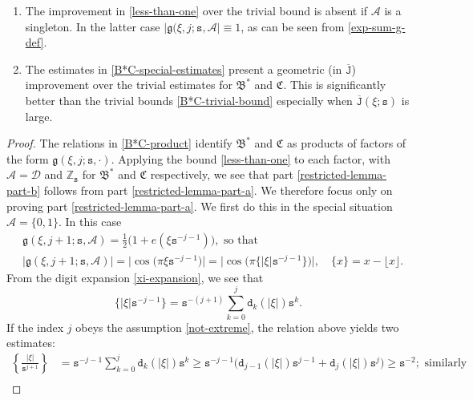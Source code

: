 \documentclass[12pt, twoside]{article}
\theoremstyle{definition}
\numberwithin{equation}{section}
\begin{document}
\vskip0.1in 
 \begin{enumerate}[1.]
\item The improvement in \eqref{less-than-one} over the trivial bound is absent if $\mathscr{A}$ is a singleton. In the latter case $|\mathfrak g(\xi, j; \mathtt s, \mathscr{A}| \equiv 1$, as can be seen from \eqref{exp-sum-g-def}. 
\item The estimates in \eqref{B*C-special-estimates} present a geometric (in $\overline{\mathtt J}$) improvement over the trivial estimates for $\mathfrak B^{\ast}$ and $\mathfrak C$. This is significantly better than the trivial bounds \eqref{B*C-trivial-bound} especially when $\overline{\mathtt J}(\xi; \mathtt s)$ is large.    
\end{enumerate} 
\begin{proof} 
The relations in \eqref{B*C-product} identify $\mathfrak B^{\ast}$ and $\mathfrak C$ as products of factors of the form $\mathfrak g(\xi, j; \mathtt s, \cdot)$. Applying the bound \eqref{less-than-one} to each factor, with $\mathscr{A} = \mathscr{D}$ and $\mathbb Z_{\mathtt s}$ for $\mathfrak{B}^{\ast}$ and $\mathfrak C$ respectively, we see that part \eqref{restricted-lemma-part-b} follows from part \eqref{restricted-lemma-part-a}. We therefore focus only on proving part \eqref{restricted-lemma-part-a}. We first do this in the special situation $\mathscr{A} = \{0, 1\}$. In this case 
\begin{align} 
&\mathfrak g(\xi, j+1; \mathtt s, \mathscr{A}) = \frac{1}{2} \bigl( 1 + e(\xi \mathtt s^{-j-1})\bigr), \text{ so that } \nonumber  \\ 
&\bigl|\mathfrak g(\xi, j+1; \mathtt s, \mathscr{A}) \bigr| = \bigl| \cos \bigl({\pi \xi}{\mathtt s^{-j-1}}\bigr) \bigr| =   \bigl|\cos \bigl(\pi\bigl\{{ |\xi|}{\mathtt s^{-j-1}} \bigr\}\bigr) \bigr|,  \quad \{x\} = x - \lfloor x \rfloor.  \label{D01} 
\end{align} 
From the digit expansion \eqref{xi-expansion}, we see that 
\[ \{|\xi| \mathtt s^{-j-1}\} = \mathtt s^{-(j+1)} \sum_{k=0}^j \mathtt  d_k(|\xi|) \mathtt s^k.  \]   
If the index $j$ obeys the assumption \eqref{not-extreme}, the relation above yields two estimates:
 \begin{align}  
 \left\{\frac{|\xi|}{\mathtt s^{j+1}}\right\}  &=  \mathtt s^{-j-1} \sum_{k=0}^{j} \mathtt d_k(|\xi|) \mathtt s^k \geq \mathtt s^{-j-1} \bigl( \mathtt d_{j-1}(|\xi|) \mathtt s^{j-1} + \mathtt d_j(|\xi|) \mathtt s^j \bigr) \geq \mathtt s^{-2}; \text{ similarly } \label{D01+}  \\ 

\end{align}
\end{proof}
\end{document}
